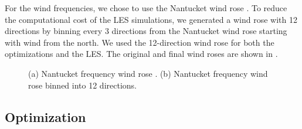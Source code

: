 \documentclass[conf]{new-aiaa}
\begin{document}
For the wind frequencies, we chose to use the Nantucket wind rose \cite{wrcc2017}. %
To reduce the computational cost of the LES simulations, we generated a wind rose with 12 directions by binning every 3 directions from the Nantucket wind rose starting with wind from the north. We used the 12-direction wind rose for both the optimizations and the LES. The original and final wind roses are shown in .

\begin{figure}[ht]
	\centering
	\caption{(a) Nantucket frequency wind rose \cite{wrcc2017}. (b) Nantucket frequency wind rose binned into 12 directions.}
	\label{fig:windrose}
\end{figure}

\subsection{Optimization}\label{sec:opt}
\end{document}
